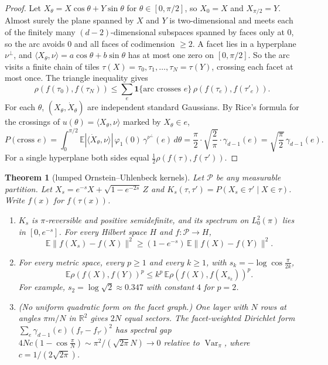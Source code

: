 \documentclass[11pt]{article}
\newtheorem{theorem}{Theorem}[section]
\theoremstyle{definition}
\theoremstyle{remark}
\newcommand{\R}{\mathbb R}
\newcommand{\E}{\mathbb E}
\newcommand{\Var}{\operatorname{Var}}
\begin{document}
\begin{proof}
Let $X_\theta=X\cos\theta+Y\sin\theta$ for $\theta\in[0,\pi/2]$, so $X_0=X$ and $X_{\pi/2}=Y$. Almost surely the plane spanned by $X$ and $Y$ is two-dimensional and meets each of the finitely many $(d-2)$-dimensional subspaces spanned by faces only at $0$, so the arc avoids $0$ and all faces of codimension $\ge2$. A facet lies in a hyperplane $\nu^\perp$, and $\langle X_\theta,\nu\rangle=a\cos\theta+b\sin\theta$ has at most one zero on $[0,\pi/2]$. So the arc visits a finite chain of tiles $\tau(X)=\tau_0,\tau_1,\dots,\tau_N=\tau(Y)$, crossing each facet at most once. The triangle inequality gives
\[\rho(f(\tau_0),f(\tau_N))\le\sum_e\mathbf 1\{\text{arc crosses }e\}\,\rho(f(\tau_e),f(\tau'_e)).\]
For each $\theta$, $(X_\theta,\dot X_\theta)$ are independent standard Gaussians. By Rice's formula for the crossings of $u(\theta)=\langle X_\theta,\nu\rangle$ marked by $X_\theta\in e$,
\[P(\text{cross }e)=\int_0^{\pi/2}\E|\langle\dot X_\theta,\nu\rangle|\,\varphi_1(0)\,\gamma^{\nu^\perp}(e)\,d\theta=\frac\pi2\cdot\sqrt{\frac2\pi}\cdot\gamma_{d-1}(e)=\sqrt{\frac\pi2}\,\gamma_{d-1}(e).\]
For a single hyperplane both sides equal $\frac12\rho(f(\tau),f(\tau'))$.
\end{proof}

\begin{theorem}[lumped Ornstein--Uhlenbeck kernels]\label{thm:ou}
Let $\mathcal P$ be any measurable partition. Let $X_s=e^{-s}X+\sqrt{1-e^{-2s}}\,Z$ and $K_s(\tau,\tau')=P(X_s\in\tau'\mid X\in\tau)$. Write $f(x)$ for $f(\tau(x))$.
\begin{enumerate}
\item[(a)] $K_s$ is $\pi$-reversible and positive semidefinite, and its spectrum on $L^2_0(\pi)$ lies in $[0,e^{-s}]$. For every Hilbert space $H$ and $f:\mathcal P\to H$,
\[\E\|f(X_s)-f(X)\|^2\ge(1-e^{-s})\,\E\|f(X)-f(Y)\|^2.\]
\item[(b)] For every metric space, every $p\ge1$ and every $k\ge1$, with $s_k=-\log\cos\frac{\pi}{2k}$,
\[\E\rho(f(X),f(Y))^p\le k^p\,\E\rho(f(X),f(X_{s_k}))^p.\]
For example, $s_2=\log\sqrt2\approx0.347$ with constant $4$ for $p=2$.
\item[(c)] (No uniform quadratic form on the facet graph.) One layer with $N$ rows at angles $\pi m/N$ in $\R^2$ gives $2N$ equal sectors. The facet-weighted Dirichlet form $\sum_e\gamma_{d-1}(e)(f_\tau-f_{\tau'})^2$ has spectral gap $4Nc(1-\cos\frac\pi N)\sim\pi^2/(\sqrt{2\pi}N)\to0$ relative to $\Var_\pi$, where $c=1/(2\sqrt{2\pi})$.
\end{enumerate}
\end{theorem}
\end{document}
